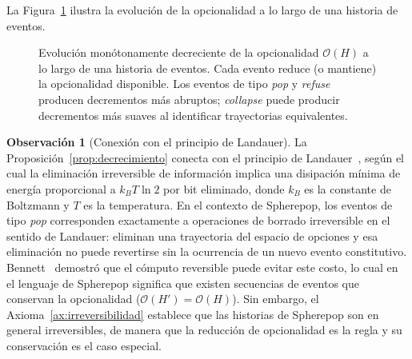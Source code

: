 \documentclass[12pt]{article}
\theoremstyle{plain}
\theoremstyle{definition}
\newtheorem{remark}[theorem]{Observación}
\begin{document}
La Figura~\ref{fig:opcionalidad} ilustra la evolución de la opcionalidad a lo largo de una historia de eventos.

\begin{figure}[ht]
\centering
{}
\caption{Evolución monótonamente decreciente de la opcionalidad $\mathcal{O}(H)$ a lo largo de una historia de eventos. Cada evento reduce (o mantiene) la opcionalidad disponible. Los eventos de tipo \emph{pop} y \emph{refuse} producen decrementos más abruptos; \emph{collapse} puede producir decrementos más suaves al identificar trayectorias equivalentes.}
\label{fig:opcionalidad}
\end{figure}

\begin{remark}[Conexión con el principio de Landauer]
La Proposición~\ref{prop:decrecimiento} conecta con el principio de Landauer~\cite{landauer}, según el cual la eliminación irreversible de información implica una disipación mínima de energía proporcional a $k_B T \ln 2$ por bit eliminado, donde $k_B$ es la constante de Boltzmann y $T$ es la temperatura. En el contexto de Spherepop, los eventos de tipo \emph{pop} corresponden exactamente a operaciones de borrado irreversible en el sentido de Landauer: eliminan una trayectoria del espacio de opciones y esa eliminación no puede revertirse sin la ocurrencia de un nuevo evento constitutivo. Bennett~\cite{bennett} demostró que el cómputo reversible puede evitar este costo, lo cual en el lenguaje de Spherepop significa que existen secuencias de eventos que conservan la opcionalidad ($\mathcal{O}(H') = \mathcal{O}(H)$). Sin embargo, el Axioma~\ref{ax:irreversibilidad} establece que las historias de Spherepop son en general irreversibles, de manera que la reducción de opcionalidad es la regla y su conservación es el caso especial.
\end{remark}
\end{document}
